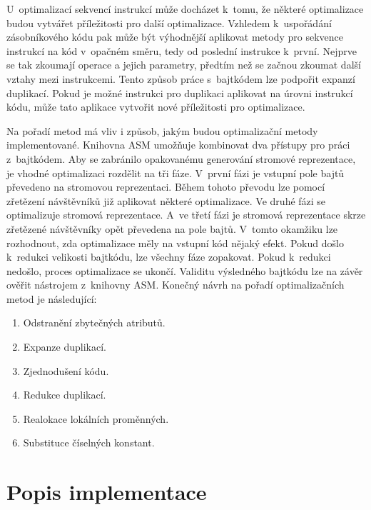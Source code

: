 U~optimalizací sekvencí instrukcí může docházet k~tomu, že některé optimalizace budou vytvářet příležitosti pro další optimalizace. Vzhledem k~uspořádání zásobníkového kódu pak může být výhodnější aplikovat metody pro sekvence instrukcí na kód v~opačném směru, tedy od poslední instrukce k~první. Nejprve se tak zkoumají operace a jejich parametry, předtím než se začnou zkoumat další vztahy mezi instrukcemi. Tento způsob práce s~bajtkódem lze podpořit expanzí duplikací. Pokud je možné instrukci pro duplikaci aplikovat na úrovni instrukcí kódu, může tato aplikace vytvořit nové příležitosti pro optimalizace.

Na pořadí metod má vliv i způsob, jakým budou optimalizační metody implementované. Knihovna ASM umožňuje kombinovat dva přístupy pro práci z~bajtkódem. Aby se zabránilo opakovanému generování stromové reprezentace, je vhodné optimalizaci rozdělit na tři fáze. V~první fázi je vstupní pole bajtů převedeno na stromovou reprezentaci. Během tohoto převodu lze pomocí zřetězení návštěvníků již aplikovat některé optimalizace. Ve druhé fázi se optimalizuje stromová reprezentace. A~ve třetí fázi je stromová reprezentace skrze zřetězené návštěvníky opět převedena na pole bajtů. V~tomto okamžiku lze rozhodnout, zda optimalizace měly na vstupní kód nějaký efekt. Pokud došlo k~redukci velikosti bajtkódu, lze všechny fáze zopakovat. Pokud k~redukci nedošlo, proces optimalizace se ukončí. Validitu výsledného bajtkódu lze na závěr ověřit nástrojem z~knihovny ASM.
Konečný návrh na pořadí optimalizačních metod je následující:

\begin{enumerate}
\setlength{\itemsep}{0pt}
\setlength{\parskip}{0pt}
\item Odstranění zbytečných atributů.
\item Expanze duplikací.
\item Zjednodušení kódu.
\item Redukce duplikací.
\item Realokace lokálních proměnných.
\item Substituce číselných konstant.
\end{enumerate}


\section{Popis implementace}

